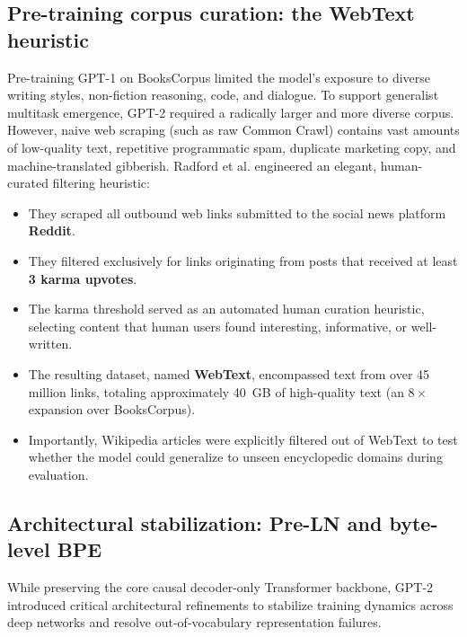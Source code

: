 \documentclass[../../main.tex]{subfiles}
\begin{document}
\subsection{Pre-training corpus curation: the WebText heuristic}
\label{subsec:gpt2_webtext_curation}

Pre-training GPT-1 on BooksCorpus limited the model's exposure to diverse writing styles, non-fiction reasoning, code, and dialogue. To support generalist multitask emergence, GPT-2 required a radically larger and more diverse corpus. However, naive web scraping (such as raw Common Crawl) contains vast amounts of low-quality text, repetitive programmatic spam, duplicate marketing copy, and machine-translated gibberish. Radford et al. engineered an elegant, human-curated filtering heuristic:
\begin{itemize}
    \item They scraped all outbound web links submitted to the social news platform \textbf{Reddit}.
    \item They filtered exclusively for links originating from posts that received at least \textbf{3 karma upvotes}.
    \item The karma threshold served as an automated human curation heuristic, selecting content that human users found interesting, informative, or well-written.
    \item The resulting dataset, named \textbf{WebText}, encompassed text from over 45 million links, totaling approximately 40~GB of high-quality text (an $8\times$ expansion over BooksCorpus).
    \item Importantly, Wikipedia articles were explicitly filtered out of WebText to test whether the model could generalize to unseen encyclopedic domains during evaluation.
\end{itemize}

\subsection{Architectural stabilization: Pre-LN and byte-level BPE}
\label{subsec:gpt2_preln_stabilization}

While preserving the core causal decoder-only Transformer backbone, GPT-2 introduced critical architectural refinements to stabilize training dynamics across deep networks and resolve out-of-vocabulary representation failures.
\end{document}
